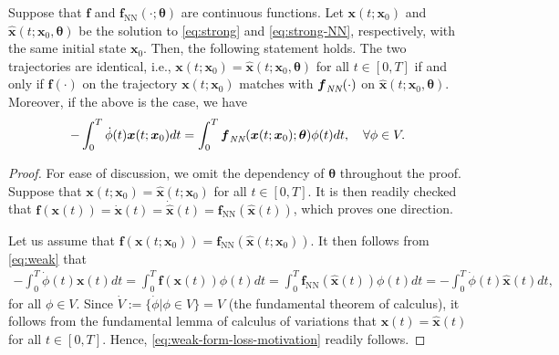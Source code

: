 \documentclass[final]{siamltex}
\newcommand{\bfa}[1]{\boldsymbol{#1}}
\begin{document}
\begin{proposition} \label{prop:weak-form-motivation}
    Suppose that $\bfa{f}$ and $\bfa{f}_\text{NN}(\cdot;\bfa{\theta})$ are continuous functions.
    Let $\bfa{x}(t;\bfa{x}_0)$ and $\widehat{\bfa{x}}(t;\bfa{x}_0,\bfa{\theta})$ be the solution to 
    \eqref{eq:strong} and \eqref{eq:strong-NN}, respectively, with the same initial state $\bfa{x}_0$.
    Then, the following statement holds. 
    The two trajectories are identical, i.e., $\bfa{x}(t;\bfa{x}_0)=\widehat{\bfa{x}}(t;\bfa{x}_0,\bfa{\theta})$ for all $t \in [0,T]$
    if and only if 
    $\bfa{f}(\cdot)$ on the trajectory $\bfa{x}(t;\bfa{x}_0)$ matches with $\bfa{f}_\emph{\text{NN}}(\cdot)$ on $\widehat{\bfa{x}}(t;\bfa{x}_0,\bfa{\theta})$.
    Moreover, if the above is the case, we have
    \begin{equation} \label{eq:weak-form-loss-motivation}
        -\int_0^T  \dot{\phi}(t) \bfa{x}(t;\bfa{x}_0) dt = \int_0^T \bfa{f}_\emph{\text{NN}}(\bfa{x}(t;\bfa{x}_0);\bfa{\theta}) \phi(t) dt, \quad \forall \phi \in V.
    \end{equation}
\end{proposition}
\begin{proof}
    For ease of discussion, we omit the dependency of $\bfa{\theta}$ throughout the proof.
    Suppose that $\bfa{x}(t;\bfa{x}_0)=\widehat{\bfa{x}}(t;\bfa{x}_0)$ for all $t \in [0,T]$.
    It is then readily checked that 
    $\bfa{f}(\bfa{x}(t)) = \dot{\bfa{x}}(t) = \dot{\widehat{\bfa{x}}}(t) = \bfa{f}_\text{NN}(\widehat{\bfa{x}}(t))$,
    which proves one direction.

    Let us assume that $\bfa{f}(\bfa{x}(t;\bfa{x}_0)) = \bfa{f}_{\text{NN}}(\widehat{\bfa{x}}(t;\bfa{x}_0))$.
    It then follows from \eqref{eq:weak} that 
    \begin{align*}
        -\int_0^T  \dot{\phi}(t) \bfa{x}(t) dt = \int_0^T \bfa{f}(\bfa{x}(t)) \phi(t) dt
        = \int_0^T \bfa{f}_\text{NN}(\widehat{\bfa{x}}(t)) \phi(t) dt = -\int_0^T  \dot{\phi}(t) \widehat{\bfa{x}}(t) dt,
    \end{align*}
    for all $\phi \in V$.
    Since $\dot{V}:= \{\dot{\phi} | \phi \in V\} = V$ (the fundamental theorem of calculus), it follows from the fundamental lemma of calculus of variations that 
    $\bfa{x}(t) = \widehat{\bfa{x}}(t)$ for all $t \in [0,T]$.
    Hence, \eqref{eq:weak-form-loss-motivation} readily follows.
\end{proof}
\end{document}

